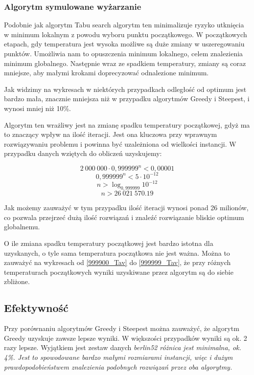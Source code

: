 \subsubsection{Algorytm symulowane wyżarzanie}

Podobnie jak algorytm Tabu search algorytm ten minimalizuje ryzyko utknięcia w minimum 
lokalnym z powodu wyboru punktu początkowego. W początkowych etapach, gdy temperatura jest 
wysoka możliwe są duże zmiany w uszeregowaniu punktów. Umożliwia nam to opuszczenia minimum
lokalnego, celem znalezienia minimum globalnego. Następnie wraz ze spadkiem temperatury, zmiany 
są coraz mniejsze, aby małymi krokami doprecyzować odnalezione minimum. 

Jak widzimy na wykresach w niektórych przypadkach odległość od optimum jest bardzo mała, znacznie 
mniejsza niż w przypadku algorytmów Greedy i Steepest, i wynosi mniej niż 10\%. 

Algorytm ten wrażliwy jest na zmianę spadku temperatury początkowej, gdyż ma to znaczący 
wpływ na ilość iteracji. Jest ona kluczowa przy wprawnym rozwiązywaniu problemu i powinna być 
uzależniona od wielkości instancji. W przypadku danych wziętych do obliczeń uzyskujemy:

$$ 2~000~000 \cdot 0,999999^{n} < 0,00001 $$
$$ 0,999999^{n} < 5 \cdot 10^{-12} $$
$$ n > \log_{0,999999}10^{-12} $$
$$ n > 26~021~570.19 $$

Jak możemy zauważyć w tym przypadku ilość iteracji wynosi ponad 26 milionów, co pozwala przejrzeć 
dużą ilość rozwiązań i znaleźć rozwiązanie bliskie optimum globalnemu.

O ile zmiana spadku temperatury początkowej jest bardzo istotna dla uzyskanych, o tyle sama 
temperatura początkowa nie jest ważna. Można to zauważyć na wykresach od \ref{999900_Tav} do 
\ref{999999_Tav}, że przy różnych temperaturach początkowych wyniki uzyskiwane przez algorytm 
są do siebie zbliżone. 


\subsection{Efektywność}

Przy porównaniu algorytmów Greedy i Steepest można zauważyć, że algorytm Greedy uzyskuje 
zawsze lepsze wyniki. W większości przypadków wyniki są ok. 2 razy lepsze. Wyjątkiem jest 
zestaw danych \it berlin52 \rm różnica jest minimalna, ok. 4\%. Jest to spowodowane 
bardzo małymi rozmiarami instancji, więc i dużym prawdopodobieństwem znalezienia podobnych
rozwiązań przez oba algorytmy.

